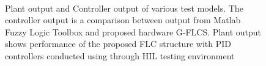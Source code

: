\begin{figure}[h!]
	\centering
	\\
	\caption{Plant output and Controller output of various test models. The controller output is a comparison between output from Matlab Fuzzy Logic Toolbox and proposed hardware G-FLCS. Plant output shows performance of the proposed FLC structure with PID controllers conducted using through HIL testing environment} 
	\label{fig:CompOut_icc}
\end{figure}


